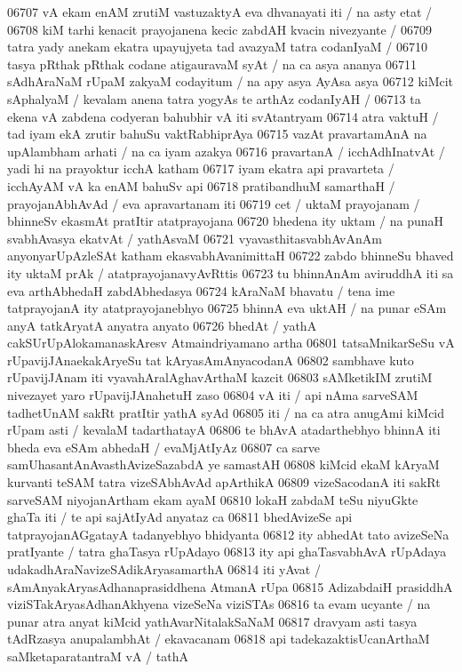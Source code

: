 06707 vA ekam enAM zrutiM vastuzaktyA eva dhvanayati iti / na asty etat /
06708 kiM tarhi kenacit prayojanena kecic zabdAH kvacin nivezyante /  
06709 tatra yady anekam ekatra upayujyeta tad avazyaM tatra codanIyaM /  
06710 tasya pRthak pRthak codane atigauravaM syAt / na ca asya ananya
06711 sAdhAraNaM rUpaM zakyaM codayitum / na apy asya AyAsa asya  
06712 kiMcit sAphalyaM / kevalam anena tatra yogyAs te arthAz  codanIyAH / 
06713 ta ekena vA zabdena codyeran bahubhir vA iti svAtantryam
06714 atra vaktuH / tad iyam ekA zrutir bahuSu vaktRabhiprAya
06715 vazAt pravartamAnA na upAlambham arhati / na ca iyam azakya 
06716 pravartanA / icchAdhInatvAt / yadi hi na prayoktur icchA katham 
06717 iyam ekatra api pravarteta / icchAyAM vA ka enAM bahuSv api  
06718 pratibandhuM samarthaH / prayojanAbhAvAd / eva apravartanam iti 
06719 cet / uktaM prayojanam / bhinneSv ekasmAt pratItir atatprayojana
06720 bhedena ity uktam / na punaH svabhAvasya ekatvAt / yathAsvaM  
06721 vyavasthitasvabhAvAnAm anyonyarUpAzleSAt katham ekasvabhAvanimittaH
06722 zabdo bhinneSu bhaved ity uktaM prAk / atatprayojanavyAvRttis
06723 tu bhinnAnAm aviruddhA iti sa eva arthAbhedaH zabdAbhedasya  
06724 kAraNaM bhavatu / tena ime tatprayojanA ity atatprayojanebhyo
06725 bhinnA eva uktAH / na punar eSAm anyA tatkAryatA anyatra anyato 
06726 bhedAt / yathA cakSUrUpAlokamanaskAresv Atmaindriyamano artha
06801 tatsaMnikarSeSu vA rUpavijJAnaekakAryeSu tat kAryasAmAnyacodanA
06802 sambhave kuto rUpavijJAnam iti vyavahAralAghavArthaM kazcit 
06803 sAMketikIM zrutiM nivezayet yaro rUpavijJAnahetuH zaso  
06804 vA iti / api nAma sarveSAM tadhetUnAM sakRt pratItir yathA syAd  
06805 iti / na ca atra anugAmi kiMcid rUpam asti / kevalaM tadarthatayA  
06806 te bhAvA atadarthebhyo bhinnA iti bheda eva eSAm abhedaH / evaMjAtIyAz
06807 ca sarve samUhasantAnAvasthAvizeSazabdA ye samastAH 
06808 kiMcid ekaM kAryaM kurvanti teSAM tatra vizeSAbhAvAd apArthikA 
06809 vizeSacodanA iti sakRt sarveSAM niyojanArtham ekam ayaM  
06810 lokaH zabdaM teSu niyuGkte ghaTa iti / te api sajAtIyAd anyataz ca  
06811 bhedAvizeSe api tatprayojanAGgatayA tadanyebhyo bhidyanta 
06812 ity abhedAt tato avizeSeNa pratIyante / tatra ghaTasya rUpAdayo  
06813 ity api ghaTasvabhAvA rUpAdaya udakadhAraNavizeSAdikAryasamarthA
06814 iti yAvat / sAmAnyakAryasAdhanaprasiddhena AtmanA rUpa  
06815 AdizabdaiH prasiddhA viziSTakAryasAdhanAkhyena vizeSeNa viziSTAs
06816 ta evam ucyante / na punar atra anyat kiMcid yathAvarNitalakSaNaM
06817 dravyam asti tasya tAdRzasya anupalambhAt / ekavacanam  
06818 api tadekazaktisUcanArthaM saMketaparatantraM vA / tathA
